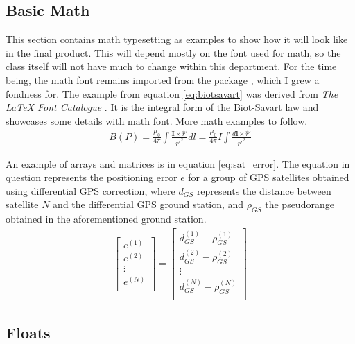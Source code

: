 \documentclass[palatino,english]{ist-report}
\begin{document}
\subsection{Basic Math}

This section contains math typesetting as examples to show how it will look like in the final product. This will depend mostly on the font used for math, so the class itself will not have much to change within this department. For the time being, the math font remains imported from the package , which I grew a fondness for. The example from equation \ref{eq:biotsavart} was derived from \textit{The \LaTeX{} Font Catalogue} \cite{fontcatalogue}. It is the integral form of the Biot-Savart law and showcases some details with math font. More math examples to follow.
\begin{gather} \label{eq:biotsavart}
	B(P) = \frac{\mu_0}{4\pi}\int{\frac{\boldsymbol{I} \times \hat{r}'}{r'^2}dl} = \frac{\mu_0}{4\pi} I \int{\frac{d\boldsymbol{l} \times \hat{r}'}{r'^2}}
\end{gather}

An example of arrays and matrices is in equation \ref{eq:sat_error}. The equation in question represents the positioning error $e$ for a group of GPS satellites obtained using differential GPS correction, where $d_{GS}$ represents the distance between satellite $N$ and the differential GPS ground station, and $\rho_{GS}$ the pseudorange obtained in the aforementioned ground station.
\begin{gather} \label{eq:sat_error}
	\left[\begin{matrix}
		e^{(1)} \\
		e^{(2)} \\
		\vdots \\
		e^{(N)} \\
	\end{matrix}\right]
	= \left[\begin{matrix}
		d^{(1)}_{GS} - \rho^{(1)}_{GS} \\
		d^{(2)}_{GS} - \rho^{(2)}_{GS} \\
		\vdots \\
		d^{(N)}_{GS} - \rho^{(N)}_{GS} \\
	\end{matrix}\right]
\end{gather}

\subsection{Floats}
\end{document}
